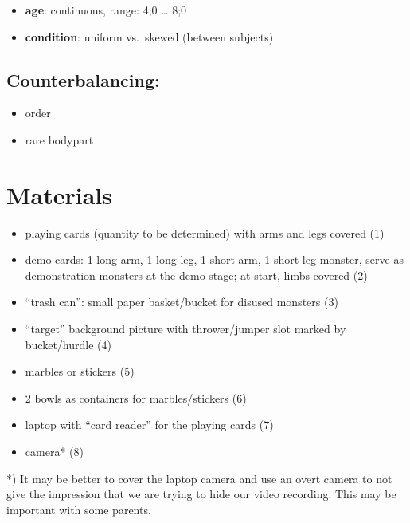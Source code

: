 \documentclass{article}
\begin{document}
\begin{itemize}

\item
  \textbf{age}: continuous, range: 4;0 \ldots{} 8;0
\item
  \textbf{condition}: uniform vs.~skewed (between subjects)
\end{itemize}

\subsection{Counterbalancing:}\label{counterbalancing}

\begin{itemize}

\item
  order
\item
  rare bodypart
\end{itemize}

\section{Materials}\label{materials}

\begin{itemize}

\item
  playing cards (quantity to be determined) with arms and legs covered (1)
\item
  demo cards: 1 long-arm, 1 long-leg, 1 short-arm, 1 short-leg monster, serve as demonstration monsters at the demo stage; at start, limbs covered (2)
\item
  ``trash can'': small paper basket/bucket for disused monsters (3)
\item
  ``target'' background picture with thrower/jumper slot marked by bucket/hurdle (4)
\item
  marbles or stickers (5)
\item
  2 bowls as containers for marbles/stickers (6)
\item
  laptop with ``card reader'' for the playing cards (7)
\item
  camera* (8)
\end{itemize}

*) It may be better to cover the laptop camera and use an overt camera to not give the impression that we are trying to hide our video recording.
This may be important with some parents.
\end{document}
